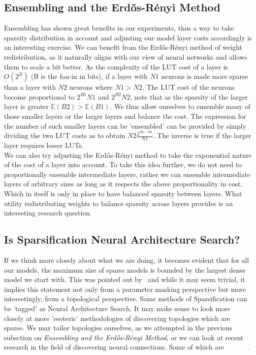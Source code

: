 \subsection{Ensembling and the {Erd\H{o}s-R\'{e}nyi} Method}
Ensembling has shown great benefits in our experiments, thus a way to take sparsity distribution in account and adjusting our model layer costs accordingly is an interesting exercise. 
We can benefit from the {Erd\H{o}s-R\'{e}nyi} method of weight redistribution, as it naturally aligns with our view of neural networks and allows them to scale a bit better. As the complexity of the LUT cost of a layer is$O(2^{B})$ (B is the fan-in in bits), if a layer with $N1$ neurons is made more sparse than a layer with $N2$ neurons where $N1>N2$. The LUT cost of the neurons become proportional to $2^{B1}{N1}$ and $2^{B2}{N2}$, note that as the sparsity of the larger layer is greater $\mathbb{E}(B2)>\mathbb{E}(B1)$. We thus allow ourselves to ensemble many of those smaller layers or the larger layers and balance the cost. The expression for the number of such smaller layers can be 'ensembled' can be provided by simply dividing the two LUT costs as to obtain $N2\frac{2^{B2-B1}}{N1}$. The inverse is true if the larger layer requires lesser LUTs. \\
We can also try adjusting the {Erd\H{o}s-R\'{e}nyi} method to take the exponential nature of the cost of a layer into account. To take this idea further, we do not need to proportionally ensemble intermediate layers, rather we can ensemble intermediate layers of arbitrary sizes as long as it respects the above proportionality in cost. Which in itself is only in place to have balanced sparsity between layers. What utility redistributing weights to balance sparsity across layers provides is an interesting research question.\\

\subsection{Is Sparsification Neural Architecture Search?}
If we think more closely about what we are doing, it becomes evident that for all our models, the maximum size of sparse models is bounded by the largest dense model we start with. This was pointed out by~\cite{evci2019rigging} and while it may seem trivial, it implies this statement not only from a parameter masking perspective but more interestingly, from a topological perspective. Some methods of Sparsification can be 'tagged' as Neural Architecture Search. It may make sense to look more closely at more 'esoteric' methodologies of discovering topologies which are sparse. We may tailor topologies ourselves, as we attempted in the previous subsction on \textit{Ensembling and the {Erd\H{o}s-R\'{e}nyi} Method}, or we can look at recent research in the field of discovering neural connections. Some of which are ~\cite{Wortsman2019DiscoveringNW} ~\cite{Mocanu_2018} ~\cite{liu2019sparse} ~\cite{bellec2017deep}. \\

